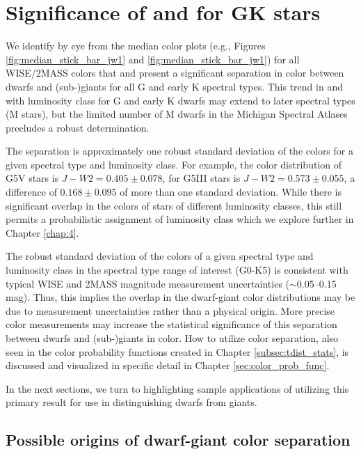 \chapter{Significance of \jwone and \jwtwo for GK stars}\label{chap:3}

We identify by eye from the median color plots (e.g., Figures \ref{fig:median_stick_bar_jw1} and \ref{fig:median_stick_bar_jw1}) for all WISE/2MASS colors that \jwone and \jwtwo present a significant separation in color between dwarfs and (sub-)giants for all G and early K spectral types. This trend in \jwone and \jwtwo with luminosity class for G and early K dwarfs may extend to later spectral types (M stars), but the limited number of M dwarfs in the Michigan Spectral Atlases precludes a robust determination.

The separation is approximately one robust standard deviation of the colors for a given spectral type and luminosity class. For example, the color distribution of G5V stars is $J-W2=0.405\pm0.078$, for G5III stars is $J-W2=0.573\pm0.055$, a difference of $0.168\pm0.095$ of more than one standard deviation. While there is significant overlap in the colors of stars of different luminosity classes, this still permits a probabilistic assignment of luminosity class which we explore further in Chapter \ref{chap:4}.

The robust standard deviation of the colors of a given spectral type and luminosity class in the spectral type range of interest (G0-K5) is consistent with typical WISE and 2MASS magnitude measurement uncertainties ($\sim$0.05--0.15 mag). Thus, this implies the overlap in the dwarf-giant color distributions may be due to measurement uncertainties rather than a physical origin.  More precise color measurements may increase the statistical significance of this separation between dwarfs and (sub-)giants in color. How to utilize color separation, also seen in the color probability functions created in Chapter \ref{subsec:tdist_stats}, is discussed and visualized in specific detail in Chapter \ref{sec:color_prob_func}. 

In the next sections, we turn to highlighting sample applications of utilizing this primary result for use in distinguishing dwarfs from giants.

\section{Possible origins of dwarf-giant color separation}

